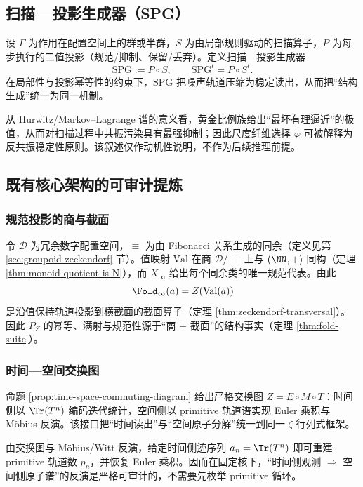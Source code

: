 \subsection{扫描—投影生成器（SPG）}\label{subsec:pom-spg}
\begin{definition}[扫描—投影生成器]\label{def:pom-spg}
设 $\Gamma$ 为作用在配置空间上的群或半群，$S$ 为由局部规则驱动的扫描算子，$P$ 为每步执行的二值投影（规范/抑制、保留/丢弃）。定义扫描—投影生成器
\[
\mathrm{SPG}:=P\circ S,
\qquad
\mathrm{SPG}^t=P\circ S^t.
\]
在局部性与投影幂等性的约束下，$\mathrm{SPG}$ 把噪声轨道压缩为稳定读出，从而把“结构生成”统一为同一机制。
\end{definition}
\begin{remark}\label{rem:pom-anti-resonance}
从 Hurwitz/Markov--Lagrange 谱的意义看，黄金比例族给出“最坏有理逼近”的极值，从而对扫描过程中共振污染具有最强抑制；因此尺度纤维选择 $\varphi$ 可被解释为反共振稳定性原则。该叙述仅作动机性说明，不作为后续推理前提。
\end{remark}

\subsection{既有核心架构的可审计提炼}\label{subsec:pom-hard-skeleton}
\subsubsection{规范投影的商与截面}\label{subsec:pom-quotient-section}
令 $\mathcal{D}$ 为冗余数字配置空间，$\equiv$ 为由 Fibonacci 关系生成的同余（定义见第 \ref{sec:groupoid-zeckendorf} 节）。值映射 $\mathrm{Val}$ 在商 $\mathcal{D}/\!\equiv$ 上与 $(\NN,+)$ 同构（定理 \ref{thm:monoid-quotient-is-N}），而 $X_\infty$ 给出每个同余类的唯一规范代表。由此
\[
\Fold_\infty(a)=Z(\mathrm{Val}(a))
\]
是沿值保持轨道投影到横截面的截面算子（定理 \ref{thm:zeckendorf-transversal}）。因此 $P_Z$ 的幂等、满射与规范性源于“商 + 截面”的结构事实（定理 \ref{thm:fold-suite}）。

\subsubsection{时间—空间交换图}\label{subsec:pom-time-space-diagram}
命题 \ref{prop:time-space-commuting-diagram} 给出严格交换图 $Z=E\circ M\circ T$：时间侧以 $\Tr(T^n)$ 编码迭代统计，空间侧以 primitive 轨道谱实现 Euler 乘积与 Möbius 反演。该接口把“时间读出”与“空间原子分解”统一到同一 $\zeta$-行列式框架。

\begin{remark}[时间迹重建空间原子谱]\label{rem:pom-trace-to-prime}
由交换图与 Möbius/Witt 反演，给定时间侧迹序列 $a_n=\Tr(T^n)$ 即可重建 primitive 轨道数 $p_n$，并恢复 Euler 乘积。因而在固定核下，“时间侧观测 $\Rightarrow$ 空间侧原子谱”的反演是严格可审计的，不需要先枚举 primitive 循环。
\end{remark}

